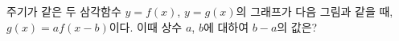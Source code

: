 주기가 같은 두 삼각함수 $y=f(x)$, $y=g(x)$의 그래프가 다음 그림과 같을 때, $g(x)=af(x-b)$이다. 이때 상수 $a$, $b$에 대하여 $b-a$의 값은? 
\par\smallskip\begin{center}\resizebox{\ifdim\width>\linewidth\linewidth\else\width\fi}{!}{}\end{center}

